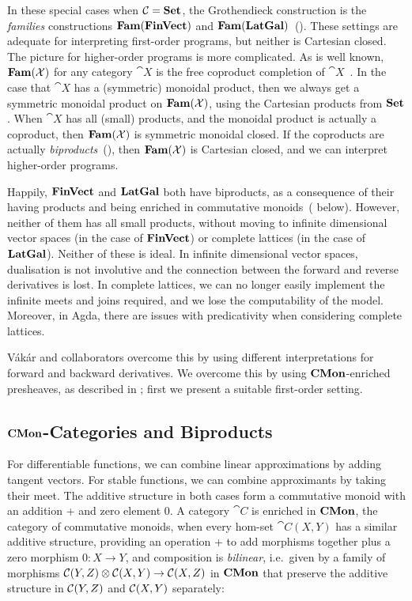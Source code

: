 In these special cases when $\mathcal{C} = \mathbf{Set}$, the Grothendieck construction is the {\em families} constructions $\mathbf{Fam}(\mathbf{FinVect})$ and $\mathbf{Fam}(\mathbf{LatGal})$~(). These settings are adequate for interpreting first-order programs, but neither is Cartesian closed. The picture for higher-order programs is more complicated. As is well known, $\mathbf{Fam}(\mathcal{X})$ for any category $\cat{X}$ is the free coproduct completion of $\cat{X}$~\cite{lawvere63}. In the case that $\cat{X}$ has a (symmetric) monoidal product, then we always get a symmetric monoidal product on $\mathbf{Fam}(\mathcal{X})$, using the Cartesian products from $\mathbf{Set}$. When $\cat{X}$ has all (small) products, and the monoidal product is actually a coproduct, then $\mathbf{Fam}(\mathcal{X})$ is symmetric monoidal closed. If the coproducts are actually {\em biproducts}~(), then $\mathbf{Fam}(\mathcal{X})$ is Cartesian closed, and we can interpret higher-order programs.

Happily, $\mathbf{FinVect}$ and $\mathbf{LatGal}$ both have biproducts, as a consequence of their having products and being enriched in commutative monoids~( below). However, neither of them has all small products, without moving to infinite dimensional vector spaces (in the case of $\mathbf{FinVect}$) or complete lattices (in the case of $\mathbf{LatGal}$). Neither of these is ideal. In infinite dimensional vector spaces, dualisation is not involutive and the connection between the forward and reverse derivatives is lost. In complete lattices, we can no longer easily implement the infinite meets and joins required, and we lose the computability of the model. Moreover, in Agda, there are issues with predicativity when considering complete lattices. 

Vákár and collaborators overcome this by using different interpretations for forward and backward derivatives. We overcome this by using $\mathbf{CMon}$-enriched presheaves, as described in ; first we present a suitable first-order setting.

\subsection{$\mathbf{CMon}$-Categories and Biproducts}
\label{sec:biproducts}

For differentiable functions, we can combine linear approximations by adding tangent vectors. For stable
functions, we can combine approximants by taking their meet. The additive structure in both cases form a
commutative monoid with an addition + and zero element 0. A category $\cat{C}$ is enriched in $\mathbf{CMon}$, the
category of commutative monoids, when every hom-set $\cat{C}(X,Y)$ has a similar additive structure, providing
an operation + to add morphisms together plus a zero morphism $0: X \to Y$, and composition is
\emph{bilinear}, i.e.~given by a family of morphisms ${\mathcal{C}}(Y,Z) \otimes {\mathcal{C}}(X,Y) \to
{\mathcal{C}}(X,Z)$ in $\mathbf{CMon}$ that preserve the additive structure in ${\mathcal{C}}(Y,Z)$ and
${\mathcal{C}}(X,Y)$ separately:

